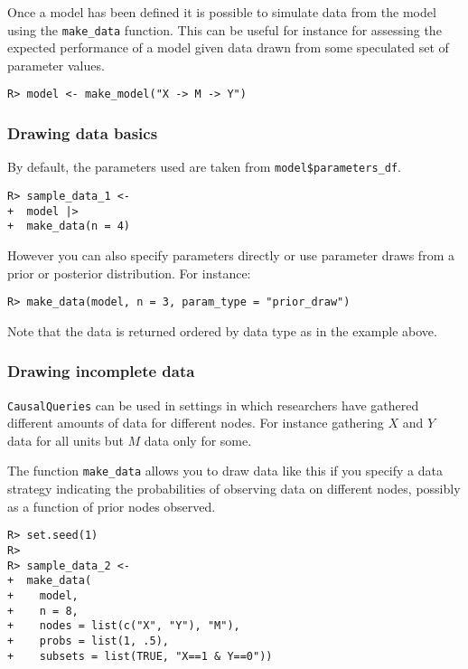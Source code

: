 \documentclass[
  11pt,
  article]{jss}
\begin{document}
Once a model has been defined it is possible to simulate data from the
model using the \texttt{make\_data} function. This can be useful for
instance for assessing the expected performance of a model given data
drawn from some speculated set of parameter values.

\begin{verbatim}
R> model <- make_model("X -> M -> Y") 
\end{verbatim}

\hypertarget{drawing-data-basics}{%
\subsubsection{Drawing data basics}\label{drawing-data-basics}}

By default, the parameters used are taken from
\texttt{model\$parameters\_df}.

\begin{verbatim}
R> sample_data_1 <- 
+  model |> 
+  make_data(n = 4)
\end{verbatim}

However you can also specify parameters directly or use parameter draws
from a prior or posterior distribution. For instance:

\begin{verbatim}
R> make_data(model, n = 3, param_type = "prior_draw")
\end{verbatim}

Note that the data is returned ordered by data type as in the example
above.

\hypertarget{drawing-incomplete-data}{%
\subsubsection{Drawing incomplete data}\label{drawing-incomplete-data}}

\texttt{CausalQueries} can be used in settings in which researchers have
gathered different amounts of data for different nodes. For instance
gathering \(X\) and \(Y\) data for all units but \(M\) data only for
some.

The function \texttt{make\_data} allows you to draw data like this if
you specify a data strategy indicating the probabilities of observing
data on different nodes, possibly as a function of prior nodes observed.

\begin{verbatim}
R> set.seed(1)
R> 
R> sample_data_2 <-
+  make_data(
+    model,
+    n = 8,
+    nodes = list(c("X", "Y"), "M"),
+    probs = list(1, .5),
+    subsets = list(TRUE, "X==1 & Y==0"))
\end{verbatim}
\end{document}
